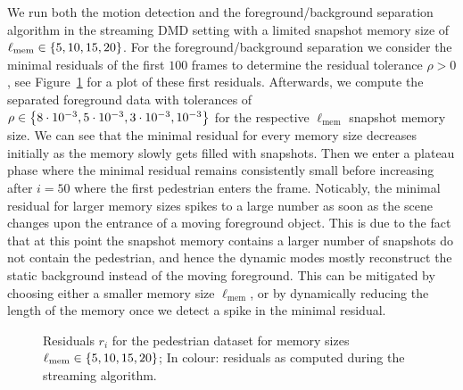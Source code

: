 We run both the motion detection and the foreground/background separation algorithm in the streaming DMD setting with a limited snapshot memory size of $\ell_\text{mem} \in \left\{5, 10, 15, 20\right\}$. For the foreground/background separation we consider the minimal residuals of the first $100$ frames to determine the residual tolerance $\rho > 0$, see Figure~\ref{fig:pedestrian-exp-residual} for a plot of these first residuals. Afterwards, we compute the separated foreground data with tolerances of $\rho \in \left\{8 \cdot 10^{-3}, 5 \cdot 10^{-3}, 3 \cdot 10^{-3}, 10^{-3}\right\}$ for the respective $\ell_\text{mem}$ snapshot memory size. We can see that the minimal residual for every memory size decreases initially as the memory slowly gets filled with snapshots. Then we enter a plateau phase where the minimal residual remains consistently small before increasing after $i = 50$ where the first pedestrian enters the frame. Noticably, the minimal residual for larger memory sizes spikes to a large number as soon as the scene changes upon the entrance of a moving foreground object. This is due to the fact that at this point the snapshot memory contains a larger number of snapshots do not contain the pedestrian, and hence the dynamic modes mostly reconstruct the static background instead of the moving foreground. This can be mitigated by choosing either a smaller memory size $\ell_\text{mem}$, or by dynamically reducing the length of the memory once we detect a spike in the minimal residual.

\begin{figure}[!ht]
    \centering
    \caption{Residuals $r_i$ for the pedestrian dataset for memory sizes $\ell_\text{mem} \in \left\{5, 10, 15, 20\right\}$; In colour: residuals as computed during the streaming algorithm.}\label{fig:pedestrian-exp-residual}
\end{figure}

